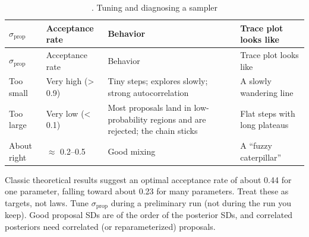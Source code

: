 \begin{longtable}[]{@{}
  >{\raggedright\arraybackslash}p{}
  >{\raggedright\arraybackslash}p{}
  >{\raggedright\arraybackslash}p{}
  >{\raggedright\arraybackslash}p{}@{}}
\caption{. Tuning and diagnosing a sampler}\tabularnewline
\toprule\noalign{}
\begin{minipage}[b]{\linewidth}\raggedright
\(\sigma_{\text{prop}}\)
\end{minipage} & \begin{minipage}[b]{\linewidth}\raggedright
Acceptance rate
\end{minipage} & \begin{minipage}[b]{\linewidth}\raggedright
Behavior
\end{minipage} & \begin{minipage}[b]{\linewidth}\raggedright
Trace plot looks like
\end{minipage} \\
\midrule\noalign{}
\endfirsthead
\toprule\noalign{}
\begin{minipage}[b]{\linewidth}\raggedright
\(\sigma_{\text{prop}}\)
\end{minipage} & \begin{minipage}[b]{\linewidth}\raggedright
Acceptance rate
\end{minipage} & \begin{minipage}[b]{\linewidth}\raggedright
Behavior
\end{minipage} & \begin{minipage}[b]{\linewidth}\raggedright
Trace plot looks like
\end{minipage} \\
\midrule\noalign{}
\endhead
\bottomrule\noalign{}
\endlastfoot
Too small & Very high (\textgreater{} 0.9) & Tiny steps; explores
slowly; strong autocorrelation & A slowly wandering line \\
Too large & Very low (\textless{} 0.1) & Most proposals land in
low-probability regions and are rejected; the chain sticks & Flat steps
with long plateaus \\
About right & \ensuremath{\approx} 0.2--0.5 & Good mixing & A ``fuzzy caterpillar'' \\
\end{longtable}

Classic theoretical results suggest an optimal acceptance rate of about
0.44 for one parameter, falling toward about 0.23 for many parameters.
Treat these as targets, not laws. Tune \(\sigma_{\text{prop}}\) during a
preliminary run (not during the run you keep). Good proposal SDs are of
the order of the posterior SDs, and correlated posteriors need
correlated (or reparameterized) proposals.

